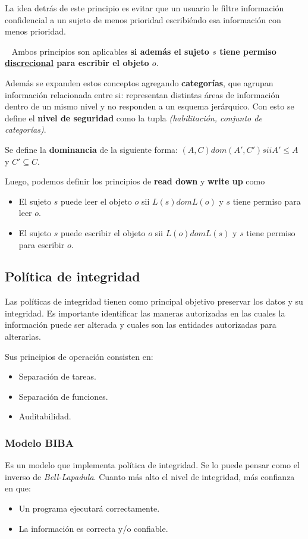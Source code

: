 \documentclass[]{article}
\begin{document}
La idea detrás de este principio es evitar que un usuario le filtre información confidencial a un sujeto de menos prioridad escribiéndo esa información con menos prioridad.

~\newline
Ambos principios son aplicables \textbf{si además el sujeto $s$ tiene permiso \underline{discrecional} para escribir el objeto $o$}.

Además se expanden estos conceptos agregando \textbf{categorías}, que agrupan información relacionada entre si: representan distintas áreas de información dentro de un mismo nivel y no responden a un esquema jerárquico. Con esto se define el \textbf{nivel de seguridad} como la tupla \emph{(habilitación, conjunto de categorías)}.

Se define la \textbf{dominancia} de la siguiente forma: $(A,C) dom (A',C') sii A'\leq A$ y $C' \subseteq C$.

Luego, podemos definir los principios de \textbf{read down} y \textbf{write up} como
\begin{itemize}
	\item El sujeto $s$ puede leer el objeto $o$ sii $L(s) dom L(o)$ y $s$ tiene permiso para leer $o$.
	\item El sujeto $s$ puede escribir el objeto $o$ sii $L(o) dom L(s)$ y $s$ tiene permiso para escribir $o$.
\end{itemize}


\subsection{Política de integridad}
Las políticas de integridad tienen como principal objetivo preservar los datos y su integridad. Es importante identificar las maneras autorizadas en las cuales la información puede ser alterada y cuales son las entidades autorizadas para alterarlas.

Sus principios de operación consisten en:
\begin{itemize}
	\item Separación de tareas.
	\item Separación de funciones.
	\item Auditabilidad.
\end{itemize}

\subsubsection{Modelo BIBA}
Es un modelo que implementa política de integridad. Se lo puede pensar como el inverso de \emph{Bell-Lapadula}. Cuanto más alto el nivel de integridad, más confianza en que:
\begin{itemize}
 	\item Un programa ejecutará correctamente.
 	\item La información es correcta y/o confiable.
 \end{itemize}
\end{document}
